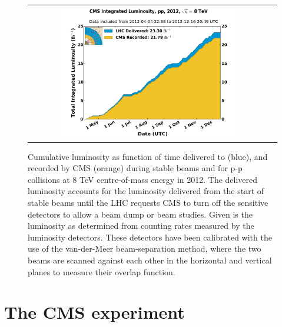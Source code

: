 \begin{figure}[tbh!]
	\centering
	\begin{tabular}{cc}
		\includegraphics[width=0.75\textwidth]{detector/pics/int_lumi_per_day_cumulative_pp_2012.pdf}
	\end{tabular}
	\caption{Cumulative luminosity as function of time delivered to (blue), and recorded by CMS (orange) during stable beams and for p-p collisions at 8 TeV centre-of-mass energy in 2012. The delivered luminosity accounts for the luminosity delivered from the start of stable beams until the LHC requests CMS to turn off the sensitive detectors to allow a beam dump or beam studies. Given is the luminosity as determined from counting rates measured by the luminosity detectors. These detectors have been calibrated with the use of the van-der-Meer beam-separation method, where the two beams are scanned against each other in the horizontal and vertical planes to measure their overlap function.}
	\label{fig:lumi_2012}
\end{figure}

\clearpage

\section{The CMS experiment}

